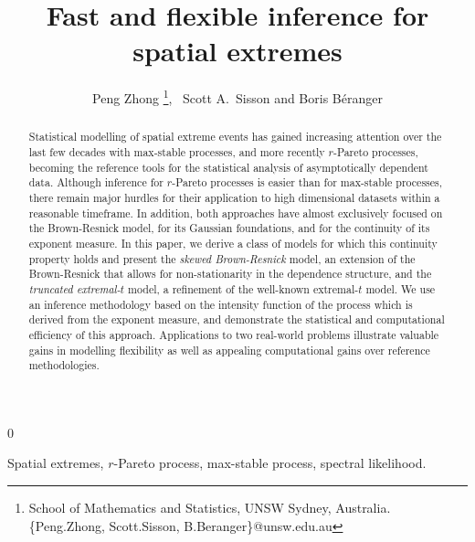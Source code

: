 \documentclass[12pt]{article}
\newcommand{\blind}{0}
\begin{document}
\title{\bf Fast and flexible inference for spatial extremes}
\blind{
  \author{Peng Zhong
  \footnote{School of Mathematics and Statistics, UNSW Sydney, Australia.\\ \{Peng.Zhong, Scott.Sisson, B.Beranger\}@unsw.edu.au}, 
  \ Scott A.~Sisson and Boris B\'{e}ranger}
  \maketitle
} \fi

\vspace{-8mm}
\baselineskip=25pt
\begin{abstract}
    Statistical modelling of spatial extreme events has gained increasing attention over the last few decades with max-stable processes, and more recently $r$-Pareto processes, becoming the reference tools for the statistical analysis of asymptotically dependent data. Although inference for $r$-Pareto processes is easier than for max-stable processes, there remain major hurdles for their application to high dimensional datasets within a reasonable timeframe. In addition, both approaches have almost exclusively focused on the Brown-Resnick model, for its Gaussian foundations, and for the continuity of its exponent measure. In this paper, we derive a class of models for which this continuity property holds and present the \emph{skewed Brown-Resnick} model, an extension of the Brown-Resnick that allows for non-stationarity in the dependence structure, and the \emph{truncated extremal-$t$} model, a refinement of the well-known extremal-$t$ model. We use an inference methodology based on the intensity function of the process which is derived from the exponent measure, and demonstrate the statistical and computational efficiency of this approach. Applications to two real-world problems illustrate valuable gains in modelling flexibility 
    as well as appealing computational gains over reference methodologies. 
\end{abstract}

  Spatial extremes, $r$-Pareto process, max-stable process, spectral likelihood.

\baselineskip=25pt

\end{document}
